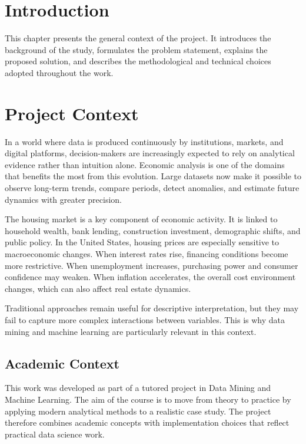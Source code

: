 
\section{Introduction}

This chapter presents the general context of the project.
It introduces the background of the study, formulates the problem statement, explains the proposed solution, and describes the methodological and technical choices adopted throughout the work.

\section{Project Context}

In a world where data is produced continuously by institutions, markets, and digital platforms, decision-makers are increasingly expected to rely on analytical evidence rather than intuition alone.
Economic analysis is one of the domains that benefits the most from this evolution.
Large datasets now make it possible to observe long-term trends, compare periods, detect anomalies, and estimate future dynamics with greater precision.

The housing market is a key component of economic activity.
It is linked to household wealth, bank lending, construction investment, demographic shifts, and public policy.
In the United States, housing prices are especially sensitive to macroeconomic changes.
When interest rates rise, financing conditions become more restrictive.
When unemployment increases, purchasing power and consumer confidence may weaken.
When inflation accelerates, the overall cost environment changes, which can also affect real estate dynamics.

Traditional approaches remain useful for descriptive interpretation, but they may fail to capture more complex interactions between variables.
This is why data mining and machine learning are particularly relevant in this context.

\subsection{Academic Context}

This work was developed as part of a tutored project in Data Mining and Machine Learning.
The aim of the course is to move from theory to practice by applying modern analytical methods to a realistic case study.
The project therefore combines academic concepts with implementation choices that reflect practical data science work.

